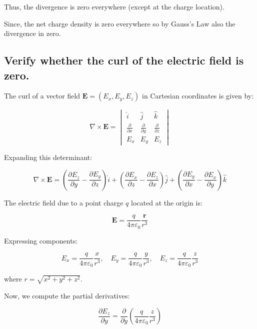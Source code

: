 \documentclass[a4paper,12pt]{article}
\begin{document}
Thus, the divergence is zero everywhere (except at the charge location).

Since, the net charge density is zero everywhere so by Gauss's Law also the divergence in zero.

\subsection{Verify whether the curl of the electric field is zero.}

The curl of a vector field \( \mathbf{E} = (E_x, E_y, E_z) \) in Cartesian coordinates is given by:

\begin{equation}
\nabla \times \mathbf{E} =
\begin{vmatrix}
\hat{i} & \hat{j} & \hat{k} \\
\frac{\partial}{\partial x} & \frac{\partial}{\partial y} & \frac{\partial}{\partial z} \\
E_x & E_y & E_z
\end{vmatrix}
\end{equation}

Expanding this determinant:

\begin{equation}
\nabla \times \mathbf{E} =
\left( \frac{\partial E_z}{\partial y} - \frac{\partial E_y}{\partial z} \right) \hat{i} +
\left( \frac{\partial E_x}{\partial z} - \frac{\partial E_z}{\partial x} \right) \hat{j} +
\left( \frac{\partial E_y}{\partial x} - \frac{\partial E_x}{\partial y} \right) \hat{k}
\end{equation}

The electric field due to a point charge \( q \) located at the origin is:

\begin{equation}
\mathbf{E} = \frac{q}{4\pi\varepsilon_0} \frac{\mathbf{r}}{r^3}
\end{equation}

Expressing components:

\begin{equation}
E_x = \frac{q}{4\pi\varepsilon_0} \frac{x}{r^3}, \quad
E_y = \frac{q}{4\pi\varepsilon_0} \frac{y}{r^3}, \quad
E_z = \frac{q}{4\pi\varepsilon_0} \frac{z}{r^3}
\end{equation}

where \( r = \sqrt{x^2 + y^2 + z^2} \).

Now, we compute the partial derivatives:

\begin{equation}
\frac{\partial E_z}{\partial y} = \frac{\partial}{\partial y} \left( \frac{q}{4\pi\varepsilon_0} \frac{z}{r^3} \right)
\end{equation}
\end{document}
